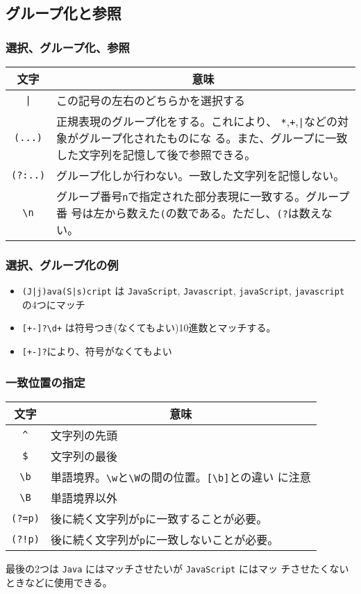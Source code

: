\subsection{グループ化と参照}
\begin{frame}[containsverbatim]
 \frametitle{選択、グループ化、参照}
\begin{center}
 \begin{tabular}{|c|m{}|}\hline
  文字&\multicolumn{1}{c|}{意味}\\\hline
\Verb+|+&この記号の左右のどちらかを選択する\\\hline
\Verb+(...)+&正規表現のグループ化をする。これにより、
      \Verb-*-,\Verb-+-,\Verb-|-などの対象がグループ化されたものにな
      る。また、グループに一致した文字列を記憶して後で参照できる。\\\hline
\Verb+(?:..)+&グループ化しか行わない。一致した文字列を記憶しない。\\\hline
\Verb+\n+&グループ番号\Verb+n+で指定された部分表現に一致する。グループ番
      号は左から数えた\Verb+(+の数である。ただし、\Verb+(?+は数えない。\\\hline
\end{tabular}
\end{center}
\end{frame}
\begin{frame}[containsverbatim]
 \frametitle{選択、グループ化の例}
\begin{itemize}\upshape
 \item \Verb-(J|j)ava(S|s)cript- は 
\Verb-JavaScript-, 
\Verb-Javascript-,
\Verb-javaScript-,
\Verb-javascript- の4つにマッチ
 \item \Verb/[+-]?\d+/ は符号つき(なくてもよい)10進数とマッチする。
 \item \Verb/[+-]?/により、符号がなくてもよい
\end{itemize}
\end{frame}
\begin{frame}[containsverbatim]
 \frametitle{一致位置の指定}
\begin{center}
 \begin{tabular}{|c|m{}|}\hline
  文字&\multicolumn{1}{c|}{意味}\\\hline
\Verb+^+&文字列の先頭\\\hline
\Verb+$+&文字列の最後\\\hline
\Verb+\b+&単語境界。\Verb+\w+と\Verb+\W+の間の位置。\Verb+[\b]+との違い
      に注意\\\hline
\Verb+\B+&単語境界以外\\\hline
\Verb+(?=p)+&後に続く文字列が\Verb+p+に一致することが必要。\\\hline
\Verb+(?!p)+&後に続く文字列が\Verb+p+に一致しないことが必要。\\\hline
\end{tabular}
\end{center}
最後の2つは \Verb+Java+ にはマッチさせたいが \Verb+JavaScript+ にはマッ
チさせたくないときなどに使用できる。
\end{frame}
